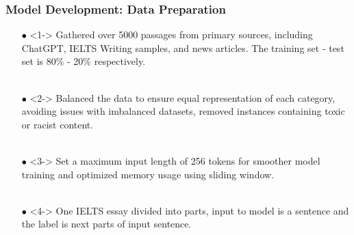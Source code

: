 \documentclass[10pt]{beamer}
\begin{document}
\begin{frame}
\frametitle{Model Development: Data Preparation}
\begin{itemize}
    \item[\textcolor{black}{$\bullet$}]<1-> Gathered over 5000 passages from primary sources, including ChatGPT, IELTS Writing samples, and news articles. The training set - test set is 80\% - 20\% respectively.\\~\\
    \item[\textcolor{black}{$\bullet$}]<2-> Balanced the data to ensure equal representation of each category, avoiding issues with imbalanced datasets, removed instances containing toxic or racist content.\\~\\
    \item[\textcolor{black}{$\bullet$}]<3-> Set a maximum input length of 256 tokens for smoother model training and optimized memory usage using sliding window.\\~\\
    \item[\textcolor{black}{$\bullet$}]<4-> One IELTS essay divided into parts, input to model is a sentence and the label is next parts of input sentence.
\end{itemize} 

\end{frame}


\end{document}
